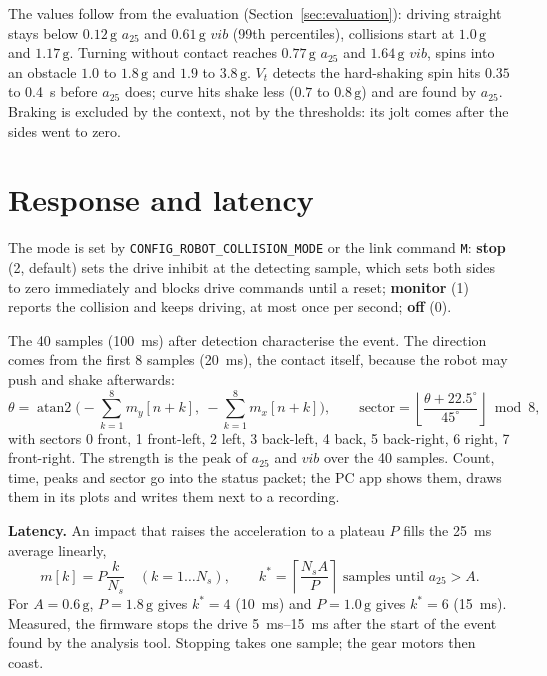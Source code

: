 \documentclass[11pt,a4paper]{article}
\newcommand{\g}{\,\mathrm{g}}
\newcommand{\code}[1]{\texttt{#1}}
\newcommand{\azf}{a_{25}}
\newcommand{\vib}{\mathit{vib}}
\begin{document}
The values follow from the evaluation (Section~\ref{sec:evaluation}): driving straight stays
below $0.12\g$ $\azf$ and $0.61\g$ $\vib$ (99th percentiles), collisions start at $1.0\g$ and
$1.17\g$. Turning without contact reaches $0.77\g$ $\azf$ and $1.64\g$ $\vib$, spins into an
obstacle $1.0$ to $1.8\g$ and $1.9$ to $3.8\g$. $V_t$ detects the hard-shaking spin hits
$0.35$ to \SI{0.4}{\second} before $\azf$ does; curve hits shake less ($0.7$ to $0.8\g$) and
are found by $\azf$.
Braking is excluded by the context, not by the thresholds: its jolt comes after the sides went
to zero.

\section{Response and latency}

The mode is set by \code{CONFIG\_ROBOT\_COLLISION\_MODE} or the link command \code{M}:
\textbf{stop} (2, default) sets the drive inhibit at the detecting sample, which sets both sides
to zero immediately and blocks drive commands until a reset; \textbf{monitor} (1) reports the
collision and keeps driving, at most once per second; \textbf{off} (0).

The 40 samples (\SI{100}{\milli\second}) after detection characterise the event. The direction
comes from the first 8 samples (\SI{20}{\milli\second}), the contact itself, because the robot may
push and shake afterwards:
\begin{equation}
  \theta = \operatorname{atan2}\!\Big(-\sum_{k=1}^{8} m_y[n+k],\ -\sum_{k=1}^{8} m_x[n+k]\Big),
  \qquad
  \text{sector} = \left\lfloor \frac{\theta + 22.5^\circ}{45^\circ} \right\rfloor \bmod 8,
\end{equation}
with sectors 0 front, 1 front-left, 2 left, 3 back-left, 4 back, 5 back-right, 6 right,
7 front-right. The strength is the peak of $\azf$ and $\vib$ over the 40 samples. Count, time,
peaks and sector go into the status packet; the PC app shows them, draws them in its plots and
writes them next to a recording.

\textbf{Latency.} An impact that raises the acceleration to a plateau $P$ fills the
\SI{25}{\milli\second} average linearly,
\begin{equation}
  m[k] = P \frac{k}{N_s} \quad (k = 1 \ldots N_s), \qquad
  k^* = \left\lceil \frac{N_s A}{P} \right\rceil \text{ samples until } \azf > A .
\end{equation}
For $A = 0.6\g$, $P = 1.8\g$ gives $k^* = 4$ (\SI{10}{\milli\second}) and $P = 1.0\g$ gives
$k^* = 6$ (\SI{15}{\milli\second}). Measured, the firmware stops the drive
\SIrange{5}{15}{\milli\second} after the start of the event found by the analysis tool. Stopping
takes one sample; the gear motors then coast.
\end{document}
